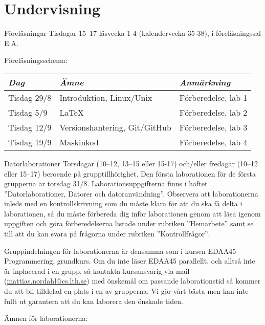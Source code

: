 \documentclass[a4paper]{memoir}
\begin{document}
\clearpage
\section*{Undervisning}

\begin{Items}
    \item[Föreläsningar]
    Tisdagar 15--17 läsvecka 1-4 (kalendervecka 35-38), i föreläsningssal E:A.

    Föreläsningsschema:

    {\hspace{0.5cm}
    \begin{tabular}{lll}
        \emph{Dag}  & \emph{Ämne}                   & \emph{Anmärkning}   \\ \midrule
        Tisdag 29/8 & Introduktion, Linux/Unix      & Förberedelse, lab 1 \\
        Tisdag 5/9  & \LaTeX                        & Förberedelse, lab 2 \\
        Tisdag 12/9 & Versionshantering, Git/GitHub & Förberedelse, lab 3 \\
        Tisdag 19/9 & Maskinkod                     & Förberedelse, lab 4 \\
    \end{tabular}
    }

    \item[Datorlaborationer]
    Torsdagar (10--12, 13--15 eller 15-17) och/eller fredagar (10--12 eller 15--17) beroende på grupptillhörighet. Den första laborationen för de första grupperna är torsdag 31/8. Laborationsuppgifterna finns i häftet ''Datorlaborationer, Datorer och datoranvändning''. Observera att laborationerna inleds med en kontrollskrivning som du måste klara för att du ska få delta i laborationen, så du måste förbereda dig inför laborationen genom att läsa igenom uppgiften och göra förberedelserna listade under rubriken ''Hemarbete'' samt se till att du kan svara på frågorna under rubriken ''Kontrollfrågor''.

    Gruppindelningen för laborationerna är densamma som i kursen EDAA45 Programmering, grundkurs. Om du inte läser EDAA45 parallellt, och alltså inte är inplacerad i en grupp, så kontakta kursansvarig via mail (\url{mattias.nordahl@cs.lth.se}) med önskemål om passande laborationstid så kommer du att bli tilldelad en plats i en av grupperna. Vi gör vårt bästa men kan inte fullt ut garantera att du kan laborera den önskade tiden.

    Ämnen för laborationerna:


\end{Items}
\end{document}
